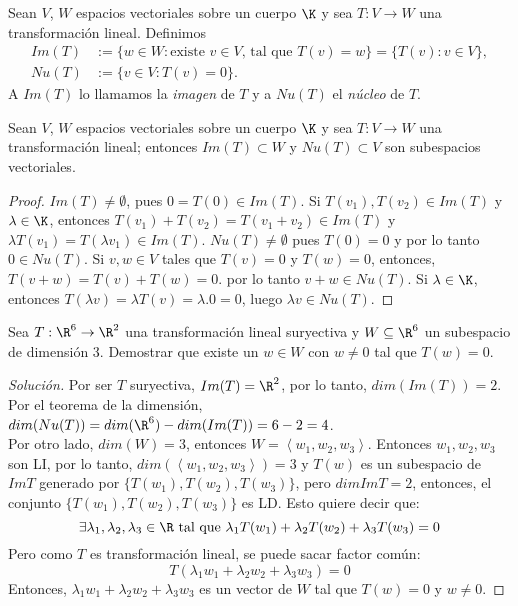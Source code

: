 \documentclass[a4,10pt]{aleph-notas}
\begin{document}
\begin{defi}
    Sean $V$, $W$ espacios vectoriales sobre un cuerpo $\K$ y sea $T:V \to W$ una transformación lineal.  Definimos
    \begin{align*}
        Im(T) &:= \{w \in W:\text{existe $v \in V$, tal que } T(v)=w\} = \{T(v): v \in V \}, \\
        Nu(T) &:= \{v \in V: T(v)=0 \}. 
    \end{align*}
    A $Im(T)$ lo llamamos la \textit{imagen} de $T$ y a $ Nu(T)$ el \textit{núcleo} de $T$. 
\end{defi}

\begin{teo}
    Sean $V$, $W$ espacios vectoriales sobre un cuerpo $\K$ y sea $T:V \to W$ una transformación lineal; entonces $Im(T) \subset W$ y $Nu(T) \subset V$ son subespacios vectoriales.
\end{teo}
\begin{proof}
    $Im(T) \ne \emptyset$, pues $0 = T(0) \in Im(T)$. 
    Si $T(v_1),T(v_2) \in Im(T)$ y $\lambda \in \K$,  entonces $T(v_1) + T(v_2) = T(v_1+v_2) \in Im(T)$ y $\lambda T(v_1) = T(\lambda v_1) \in Im(T)$.
    $Nu(T) \ne \emptyset$ pues $T(0) =0$ y por lo tanto $0 \in Nu(T)$.
    Si $v,w \in V$ tales que $T(v) =0$ y $T(w)=0$,  entonces, $T(v+w)= T(v)+T(w) =0$. por lo tanto $v+w \in Nu(T)$. Si  $\lambda \in \K$,  entonces $T(\lambda v) = \lambda T(v) = \lambda.0 =0$, luego  $\lambda v \in Nu(T)$.
\end{proof}

\begin{ejer}
    Sea $T:\R^6\rightarrow\R^2$ una transformación lineal suryectiva y $W\subseteq \R^6$ un subespacio de dimensión 3. Demostrar que existe un $w\in W$ con $w\neq 0$ tal que $T(w)=0$.
\end{ejer}
\begin{proof}[Solución]
   Por ser $T$ suryectiva, $Im(T)=\R^2$, por lo tanto, $dim(Im(T))=2$. Por el teorema de la dimensión, $dim(Nu(T))=dim(\R^6)-dim(Im(T))=6-2=4$. \\
Por otro lado, $dim(W)=3$, entonces $W=\left \langle w_1,w_2,w_3 \right \rangle$. Entonces $w_1,w_2,w_3$ son LI, por lo tanto, $dim(\left \langle w_1,w_2,w_3 \right \rangle)=3$ y $T(w)$ es un subespacio de $ImT$ generado por $\{ T(w_1), T(w_2), T(w_3) \}$, pero $dimImT=2$, entonces, el conjunto $\{ T(w_1), T(w_2), T(w_3) \}$ es LD. Esto quiere decir que: \\
\[
    \exists \lambda_1,\lambda_2,\lambda_3 \in \R \text{ tal que } \lambda_1T(w_1)+\lambda_2T(w_2)+\lambda_3T(w_3)=0
\]
Pero como $T$ es transformación lineal, se puede sacar factor común:
\[
    T(\lambda_1w_1+\lambda_2w_2+\lambda_3w_3)=0
\]
Entonces, $\lambda_1w_1+\lambda_2w_2+\lambda_3w_3$ es un vector de $W$ tal que $T(w)=0$ y $w\neq 0$.  
\end{proof}
\end{document}
